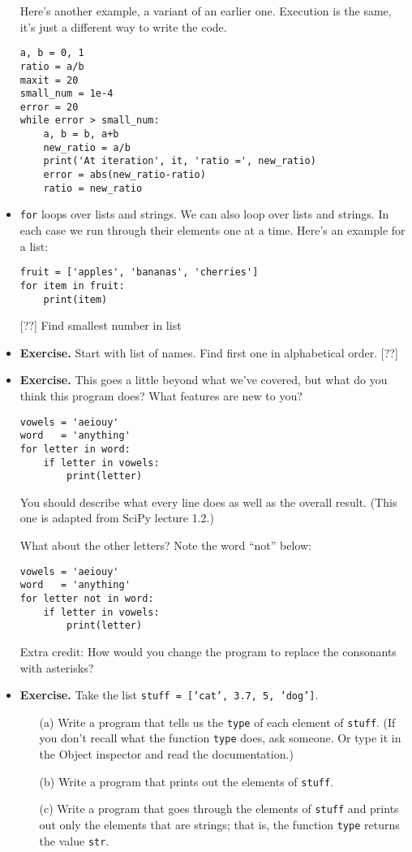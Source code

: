 \documentclass[11pt]{article}
\begin{document}
\begin{itemize}
Here's another example, a variant of an earlier one.
Execution is the same, it's just a different way to
write the code.
\begin{verbatim}
a, b = 0, 1
ratio = a/b
maxit = 20
small_num = 1e-4
error = 20
while error > small_num:
    a, b = b, a+b
    new_ratio = a/b
    print('At iteration', it, 'ratio =', new_ratio)
    error = abs(new_ratio-ratio)
    ratio = new_ratio
\end{verbatim}


\item {\tt for} loops over lists and strings.
We can also loop over lists and strings.
In each case we run through their elements one at a time.
Here's an example for a list:
\begin{verbatim}
fruit = ['apples', 'bananas', 'cherries']
for item in fruit:
    print(item)
\end{verbatim}

[??] Find smallest number in list


\item {\bf Exercise.}
Start with list of names.  Find first one in alphabetical order.  [??]


\item {\bf Exercise.}
This goes a little beyond what we've covered, but what do you think this program does?
What features are new to you?
\begin{verbatim}
vowels = 'aeiouy'
word   = 'anything'
for letter in word:
    if letter in vowels:
        print(letter)
\end{verbatim}
You should describe what every line does as well as the overall
result.
(This one is adapted from SciPy lecture 1.2.)

What about the other letters?
Note the word ``not'' below:
\begin{verbatim}
vowels = 'aeiouy'
word   = 'anything'
for letter not in word:
    if letter in vowels:
        print(letter)
\end{verbatim}


Extra credit:  How would you change the program to
replace the consonants with asterisks?


\item {\bf Exercise.}
Take the list {\tt stuff = ['cat', 3.7, 5, 'dog']}.
\begin{itemize}
\item [(a)]Write a program that tells us the {\tt type} of each element of {\tt stuff}.
(If you don't recall what the function {\tt type} does, ask someone.
Or type it in the  Object inspector and read the documentation.)
\item [(b)]  Write a program that prints out the elements of {\tt stuff}.
\item [(c)]  Write a program that goes through the elements of {\tt stuff}
and prints out only the elements that are strings;
that is, the function {\tt type} returns the value {\tt str}.
\end{itemize}


\end{itemize}
\end{document}
